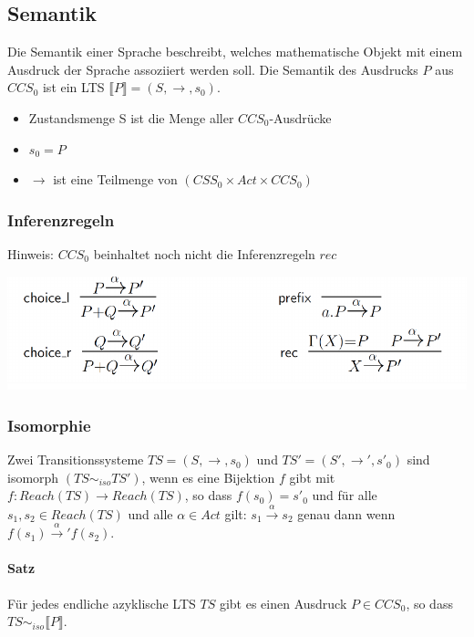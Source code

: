 \documentclass[a4paper,10pt, oneside]{book}
\begin{document}
\subsection{Semantik}
Die Semantik einer Sprache beschreibt, welches mathematische Objekt mit einem Ausdruck der Sprache assoziiert werden soll. Die Semantik des Ausdrucks $P$ aus $CCS_0$ ist ein LTS $\llbracket P \rrbracket = (S, \rightarrow, s_0)$.
\begin{itemize}
 \item Zustandsmenge S ist die Menge aller $CCS_0$-Ausdrücke
 \item $s_0 = P$
 \item $\longrightarrow$ ist eine Teilmenge von $(CSS_0 \times Act \times CCS_0)$
\end{itemize}

\subsubsection{Inferenzregeln}
\begin{flushleft}
Hinweis: $CCS_0$ beinhaltet noch nicht die Inferenzregeln $rec$
\end{flushleft}
\begin{center}
\includegraphics[scale=0.4]{inferenzregeln}
\end{center}

\subsubsection{Isomorphie}
Zwei Transitionssysteme $TS = (S,\rightarrow, s_0)$ und $TS' = (S', \rightarrow', s'_0)$ sind isomorph $(TS \sim_{iso} TS')$, wenn es eine Bijektion $f$ gibt mit $f: Reach(TS) \rightarrow Reach(TS)$, so dass $f(s_0) = s'_0$ und für alle $s_1, s_2 \in Reach(TS)$ und alle $\alpha \in Act$ gilt: $s_1 \xrightarrow{\alpha} s_2 $ genau dann wenn $f(s_1) \xrightarrow{\alpha}' f(s_2) $.

\paragraph{Satz}
Für jedes endliche azyklische LTS $TS$ gibt es einen Ausdruck $P \in CCS_0$, so dass $TS \sim_{iso} \llbracket P \rrbracket$.
\end{document}
